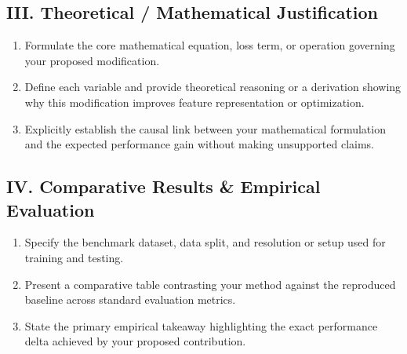 \documentclass[8pt,a4paper]{article}
\begin{document}
\subsection*{III. Theoretical / Mathematical Justification}
\begin{enumerate}
    \item Formulate the core mathematical equation, loss term, or operation governing your proposed modification.
    \item Define each variable and provide theoretical reasoning or a derivation showing why this modification improves feature representation or optimization.
    \item Explicitly establish the causal link between your mathematical formulation and the expected performance gain without making unsupported claims.
\end{enumerate}

\subsection*{IV. Comparative Results \& Empirical Evaluation}
\begin{enumerate}
    \item Specify the benchmark dataset, data split, and resolution or setup used for training and testing.
    \item Present a comparative table contrasting your method against the reproduced baseline across standard evaluation metrics.
    \item State the primary empirical takeaway highlighting the exact performance delta achieved by your proposed contribution.
\end{enumerate}
\end{document}

